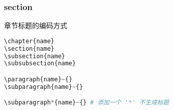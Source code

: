 
\subsubsection{section}

章节标题的编码方式

\begin{lstlisting}[language={python}]
\chapter{name}
\section{name}
\subsection{name}
\subsubsection{name}

\paragraph{name}~{}
\subparagraph{name}~{}

\subparagraph*{name}~{} # 添加一个 '*' 不生成标题 
\end{lstlisting}


